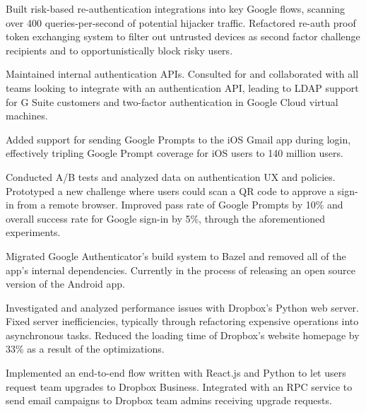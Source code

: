 \documentclass[]{template}
\begin{document}
\begin{tightemize}
\item
  Built risk-based re-authentication integrations into key Google flows,
  scanning over 400 queries-per-second of potential hijacker traffic.
  Refactored re-auth proof token exchanging system to filter out untrusted
  devices as second factor challenge recipients and to opportunistically block
  risky users.
\item
  Maintained internal authentication APIs. Consulted for and collaborated with
  all teams looking to integrate with an authentication API, leading to LDAP
  support for G Suite customers and two-factor authentication in Google Cloud
  virtual machines.
\item
  Added support for sending Google Prompts to the iOS Gmail app during login,
  effectively tripling Google Prompt coverage for iOS users to 140 million
  users.
\item
  Conducted A/B tests and analyzed data on authentication UX and policies.
  Prototyped a new challenge where users could scan a QR code to approve a
  sign-in from a remote browser. Improved pass rate of Google Prompts by 10\%
  and overall success rate for Google sign-in by 5\%, through the aforementioned
  experiments.
\item
  Migrated Google Authenticator's build system to Bazel and removed all of the
  app's internal dependencies. Currently in the process of releasing an open
  source version of the Android app.
\end{tightemize}
\sectionsep

\begin{tightemize}
\item
  Investigated and analyzed performance issues with Dropbox's Python web server.
  Fixed server inefficiencies, typically through refactoring expensive
  operations into asynchronous tasks. Reduced the loading time of Dropbox's
  website homepage by 33\% as a result of the optimizations.
\item
  Implemented an end-to-end flow written with React.js and Python to let users
  request team upgrades to Dropbox Business. Integrated with an RPC service to
  send email campaigns to Dropbox team admins receiving upgrade requests.
\end{tightemize}
\sectionsep
\end{document}
